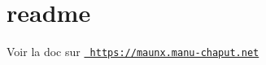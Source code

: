 \chapter{readme}
\hypertarget{md__2home_2manu_2PROGRAMMATION_2C_2ManuX_2readme}{}\label{md__2home_2manu_2PROGRAMMATION_2C_2ManuX_2readme}
Voir la doc sur \href{https://maunx.manu-chaput.net}{\texttt{ https\+://maunx.\+manu-\/chaput.\+net}} 